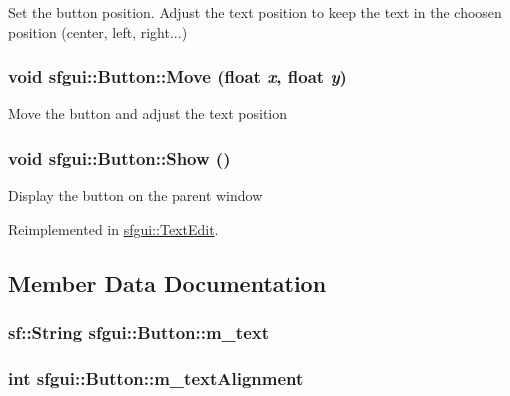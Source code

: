 Set the button position. Adjust the text position to keep the text in the choosen position (center, left, right...) \hypertarget{classsfgui_1_1Button_be36461c2e85c67b6cc42f3a6cba0468}{
\subsubsection[Move]{\setlength{\rightskip}{0pt plus 5cm}void sfgui::Button::Move (float {\em x}, \/  float {\em y})}}
\label{classsfgui_1_1Button_be36461c2e85c67b6cc42f3a6cba0468}




Move the button and adjust the text position \hypertarget{classsfgui_1_1Button_94dc6919349ff5ca9f334cce78afbe39}{
\subsubsection[Show]{\setlength{\rightskip}{0pt plus 5cm}void sfgui::Button::Show ()}}
\label{classsfgui_1_1Button_94dc6919349ff5ca9f334cce78afbe39}




Display the button on the parent window 

Reimplemented in \hyperlink{classsfgui_1_1TextEdit_1ee03247816213b34caaff365b160de0}{sfgui::TextEdit}.

\subsection{Member Data Documentation}
\hypertarget{classsfgui_1_1Button_5a436a029fef79723eed0b024b5a7693}{
\subsubsection[m\_\-text]{\setlength{\rightskip}{0pt plus 5cm}sf::String {\bf sfgui::Button::m\_\-text}}}
\label{classsfgui_1_1Button_5a436a029fef79723eed0b024b5a7693}


\hypertarget{classsfgui_1_1Button_b1ca3893cbff9b09f42e16377c0073f9}{
\subsubsection[m\_\-textAlignment]{\setlength{\rightskip}{0pt plus 5cm}int {\bf sfgui::Button::m\_\-textAlignment}}}
\label{classsfgui_1_1Button_b1ca3893cbff9b09f42e16377c0073f9}


